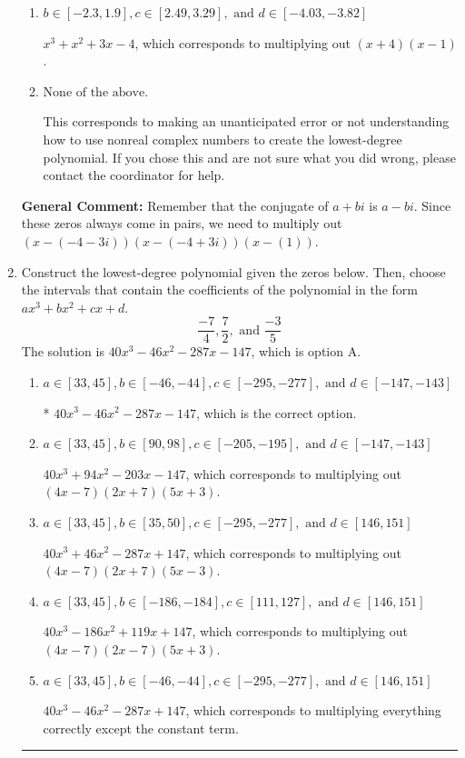 \documentclass{extbook}[14pt]
\newcommand{\litem}[1]{\item #1

\rule{\textwidth}{0.4pt}}
\begin{document}
\begin{enumerate}
{\begin{enumerate}[label=\Alph*.]
* $x^{3} +7 x^{2} +17 x -25$, which is the correct option.
\item \( b \in [-2.3, 1.9], c \in [2.49, 3.29], \text{ and } d \in [-4.03, -3.82] \)

$x^{3} + x^{2} +3 x -4$, which corresponds to multiplying out $(x + 4)(x -1)$.
\item \( \text{None of the above.} \)

This corresponds to making an unanticipated error or not understanding how to use nonreal complex numbers to create the lowest-degree polynomial. If you chose this and are not sure what you did wrong, please contact the coordinator for help.
\end{enumerate}

\textbf{General Comment:} Remember that the conjugate of $a+bi$ is $a-bi$. Since these zeros always come in pairs, we need to multiply out $(x-(-4 - 3 i))(x-(-4 + 3 i))(x-(1))$.
}
\litem{
Construct the lowest-degree polynomial given the zeros below. Then, choose the intervals that contain the coefficients of the polynomial in the form $ax^3+bx^2+cx+d$.
\[ \frac{-7}{4}, \frac{7}{2}, \text{ and } \frac{-3}{5} \]The solution is \( 40x^{3} -46 x^{2} -287 x -147 \), which is option A.\begin{enumerate}[label=\Alph*.]
\item \( a \in [33, 45], b \in [-46, -44], c \in [-295, -277], \text{ and } d \in [-147, -143] \)

* $40x^{3} -46 x^{2} -287 x -147$, which is the correct option.
\item \( a \in [33, 45], b \in [90, 98], c \in [-205, -195], \text{ and } d \in [-147, -143] \)

$40x^{3} +94 x^{2} -203 x -147$, which corresponds to multiplying out $(4x -7)(2x + 7)(5x + 3)$.
\item \( a \in [33, 45], b \in [35, 50], c \in [-295, -277], \text{ and } d \in [146, 151] \)

$40x^{3} +46 x^{2} -287 x + 147$, which corresponds to multiplying out $(4x -7)(2x + 7)(5x -3)$.
\item \( a \in [33, 45], b \in [-186, -184], c \in [111, 127], \text{ and } d \in [146, 151] \)

$40x^{3} -186 x^{2} +119 x + 147$, which corresponds to multiplying out $(4x -7)(2x -7)(5x + 3)$.
\item \( a \in [33, 45], b \in [-46, -44], c \in [-295, -277], \text{ and } d \in [146, 151] \)

$40x^{3} -46 x^{2} -287 x + 147$, which corresponds to multiplying everything correctly except the constant term.
\end{enumerate}

}
\end{enumerate}
\end{document}
